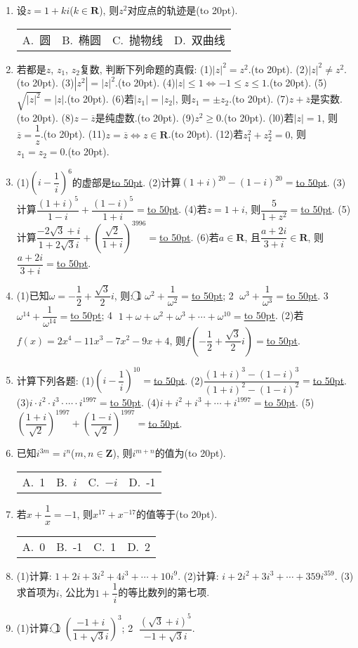 \documentclass[10pt,a4paper]{article}
\newcommand{\blank}[1]{\underline{\hbox to #1pt{}}}
\newcommand{\bracket}[1]{(\hbox to #1pt{})}
\newcommand{\fourch}[4]{\par\begin{tabular}{p{.23\textwidth}p{.23\textwidth}p{.23\textwidth}p{.23\textwidth}}
A.~#1 &B.~#2& C.~#3& D.~#4
\end{tabular}}
\begin{document}
\begin{enumerate}[1.]
\fourch{纯虚数}{实数}{虚数}{零}
\item 设$z=1+ki$($k\in \mathbf{R}$), 则$z^2$对应点的轨迹是\bracket{20}.
\fourch{圆}{椭圆}{抛物线}{双曲线}
\item 若都是$z$, $z_1$, $z_2$复数, 判断下列命题的真假:
(1)$|z|^2=z^2$.\bracket{20}.					(2)$|z|^2\ne z^2$.\bracket{20}.
(3)$|z^2|=|z|^2$.\bracket{20}.					(4)$|z|\le 1\Leftrightarrow -1\le z\le 1$.\bracket{20}.
(5)$\sqrt {|z|^2}=|z|$.\bracket{20}.					(6)若$|z_1|=|z_2|$, 则$z_1=\pm z_2$.\bracket{20}.
(7)$z+\overline z$是实数.\bracket{20}.				(8)$z-\overline z$是纯虚数.\bracket{20}.
(9)$z^2\ge 0$.\bracket{20}.						(l0)若$|z|=1$, 则$\overline z=\dfrac 1z$.\bracket{20}.
(11)$z=\overline z\Leftrightarrow z\in \mathbf{R}$.\bracket{20}.			(12)若$z_1^2+z_2^2=0$, 则$z_1=z_2=0$.\bracket{20}.
\item (1)$(i-\dfrac 1i)^6$的虚部是\blank{50}.
(2)计算$(1+i)^{20}-(1-i)^{20}=$\blank{50}.
(3)计算$\dfrac{{{(1+i)}^5}}{1-i}+\dfrac{{{(1-i)}^5}}{1+i}=$\blank{50}.
(4)若$z=1+i$, 则$\dfrac 5{1+z^2}=$\blank{50}.
(5)计算$\dfrac{-2\sqrt 3+i}{1+2\sqrt 3i}+(\dfrac{\sqrt 2}{1+i})^{3996}=$\blank{50}.
(6)若$a\in \mathbf{R}$, 且$\dfrac{a+2i}{3+i}\in \mathbf{R}$, 则$\dfrac{a+2i}{3+i}=$\blank{50}.
\item (1)已知$\omega =-\dfrac 12+\dfrac{\sqrt 3}2i$, 则: \textcircled{1} $\omega ^2+\dfrac 1{\omega ^2}=$\blank{50}; \textcircled{2} $\omega ^3+\dfrac 1{\omega ^3}=$\blank{50}.
\textcircled{3} $\omega ^{14}+\dfrac 1{\omega ^{14}}=$\blank{50}; \textcircled{4} $1+\omega +\omega ^2+\omega ^3+\cdots +\omega ^{10}=$\blank{50}.
(2)若$f(x)=2x^4-11x^3-7x^2-9x+4$, 则$f(-\dfrac 12+\dfrac{\sqrt 3}2i)=$\blank{50}.
\item 计算下列各题:
(1)$(i-\dfrac 1i)^{10}=$\blank{50}.
(2)$\dfrac{{{(1+i)}^3}-{{(1-i)}^3}}{{{(1+i)}^2}-{{(1-i)}^2}}=$\blank{50}.
(3)$i\cdot i^2\cdot i^3\cdot \cdots \cdot i^{1997}=$\blank{50}.
(4)$i+i^2+i^3+\cdots +i^{1997}=$\blank{50}.
(5)$(\dfrac{1+i}{\sqrt 2})^{1997}+(\dfrac{1-i}{\sqrt 2})^{1997}=$\blank{50}.
\item 已知$i^{3m}=i^n$($m,n\in \mathbf{Z}$), 则$i^{m+n}$的值为\bracket{20}.
\fourch{1}{$i$}{$-i$}{-1}
\item 若$x+\dfrac 1x=-1$, 则$x^{17}+x^{-17}$的值等于\bracket{20}.
\fourch{0}{-1}{1}{2}
\item (1)计算: $1+2i+3i^2+4i^3+\cdots +10i^9$.
(2)计算:  $i+2i^2+3i^3+\cdots +359i^{359}$.
(3)求首项为$i$, 公比为$1+\dfrac 1i$的等比数列的第七项.
\item (1)计算:
\textcircled{1} $(\dfrac{-1+i}{1+\sqrt 3i})^3$; 							\textcircled{2} $\dfrac{{{(\sqrt 3+i)}^5}}{-1+\sqrt 3i}$.

\end{enumerate}
\end{document}
